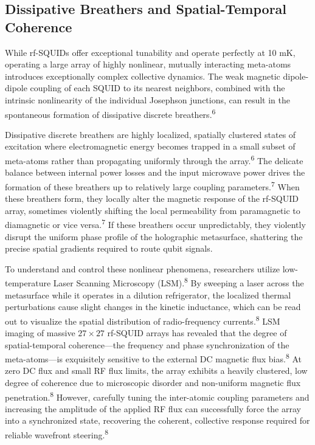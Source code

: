 \documentclass[11pt, a4paper]{article}
\begin{document}
\subsection*{Dissipative Breathers and Spatial-Temporal Coherence}

While rf-SQUIDs offer exceptional tunability and operate perfectly at 10 mK, operating a large array of highly nonlinear, mutually interacting meta-atoms introduces exceptionally complex collective dynamics. The weak magnetic dipole-dipole coupling of each SQUID to its nearest neighbors, combined with the intrinsic nonlinearity of the individual Josephson junctions, can result in the spontaneous formation of dissipative discrete breathers.\textsuperscript{6}

Dissipative discrete breathers are highly localized, spatially clustered states of excitation where electromagnetic energy becomes trapped in a small subset of meta-atoms rather than propagating uniformly through the array.\textsuperscript{6} The delicate balance between internal power losses and the input microwave power drives the formation of these breathers up to relatively large coupling parameters.\textsuperscript{7} When these breathers form, they locally alter the magnetic response of the rf-SQUID array, sometimes violently shifting the local permeability from paramagnetic to diamagnetic or vice versa.\textsuperscript{7} If these breathers occur unpredictably, they violently disrupt the uniform phase profile of the holographic metasurface, shattering the precise spatial gradients required to route qubit signals.

To understand and control these nonlinear phenomena, researchers utilize low-temperature Laser Scanning Microscopy (LSM).\textsuperscript{8} By sweeping a laser across the metasurface while it operates in a dilution refrigerator, the localized thermal perturbations cause slight changes in the kinetic inductance, which can be read out to visualize the spatial distribution of radio-frequency currents.\textsuperscript{8} LSM imaging of massive $27 \times 27$ rf-SQUID arrays has revealed that the degree of spatial-temporal coherence---the frequency and phase synchronization of the meta-atoms---is exquisitely sensitive to the external DC magnetic flux bias.\textsuperscript{8} At zero DC flux and small RF flux limits, the array exhibits a heavily clustered, low degree of coherence due to microscopic disorder and non-uniform magnetic flux penetration.\textsuperscript{8} However, carefully tuning the inter-atomic coupling parameters and increasing the amplitude of the applied RF flux can successfully force the array into a synchronized state, recovering the coherent, collective response required for reliable wavefront steering.\textsuperscript{8}
\end{document}
